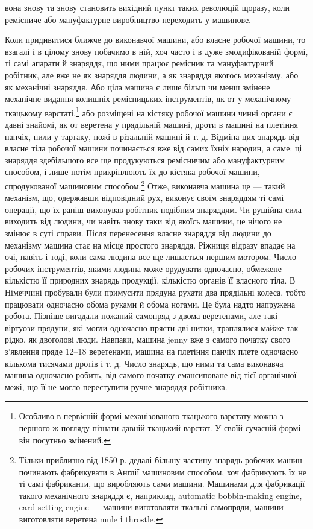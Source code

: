\parcont{}  %
вона знову та знову становить вихідний пункт таких революцій
щоразу, коли ремісниче або мануфактурне виробництво переходить
у машинове.

Коли придивитися ближче до виконавчої машини, або власне
робочої машини, то взагалі і в цілому знову побачимо в ній, хоч
часто і в дуже змодифікованій формі, ті самі апарати й знаряддя,
що ними працює ремісник та мануфактурний робітник, але
вже не як знаряддя людини, а як знаряддя якогось механізму,
або як механічні знаряддя. Або ціла машина є лише більш
чи менш змінене механічне видання колишніх ремісницьких
інструментів, як от у механічному ткацькому варстаті,\footnote{
Особливо в первісній формі механізованого ткацького варстату
можна з першого ж погляду пізнати давній ткацький варстат. У своїй
сучасній формі він посутньо змінений.
} або розміщені на кістяку робочої машини чинні органи є давні
знайомі, як от веретена у прядільній машині, дроти в машині
на плетіння панчіх, пили у тартаку, ножі в різальній машині
й т. д. Відміна цих знарядь від власне тіла робочої машини
починається вже від самих їхніх народин, а саме: ці знаряддя
здебільшого все ще продукуються ремісничим або мануфактурним
способом, і лише потім прикріплюють їх до кістяка
робочої машини, спродукованої машиновим способом.\footnote{
Тільки приблизно від 1850 р. дедалі більшу частину знарядь робочих
машин починають фабрикувати в Англії машиновим способом, хоч
фабрикують їх не ті самі фабриканти, що виробляють сами машини.
Машинами для фабрикації такого механічного знаряддя є, наприклад,
automatic bobbin-making engine, card-setting engine — машини виготовляти
ткальні самопряди, машини виготовляти веретена mule і throstle.
} Отже, виконавча машина це — такий механізм, що, одержавши відповідний
рух, виконує своїм знаряддям ті самі операції, що їх раніш
виконував робітник подібним знаряддям. Чи рушійна сила виходить
від людини, чи навіть знову таки від якоїсь машини, це
нічого не змінює в суті справи. Після перенесення власне знаряддя
від людини до механізму машина стає на місце простого знаряддя.
Ріжниця відразу впадає на очі, навіть і тоді, коли сама людина
все ще лишається першим мотором. Число робочих інструментів,
якими людина може орудувати одночасно, обмежене кількістю
її природних знарядь продукції, кількістю органів її власного
тіла. В Німеччині пробували були примусити прядуна рухати
два прядільні колеса, тобто працювати одночасно обома руками
й обома ногами. Це була надто напружена робота. Пізніше вигадали
ножаний самопряд з двома веретенами, але такі віртуози-прядуни,
які могли одночасно прясти дві нитки, траплялися майже
так рідко, як двоголові люди. Навпаки, машина jenny вже з
самого початку свого з’явлення пряде 12--18 веретенами, машина
на плетіння панчіх плете одночасно кількома тисячами дротів і
т. д. Число знарядь, що ними та сама виконавча машина одночасно
робить, від самого початку емансиповане від тієї органічної
межі, що її не могло переступити ручне знаряддя робітника.
